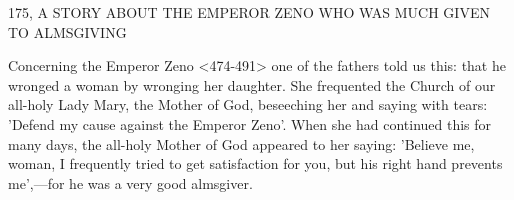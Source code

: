 175, A STORY ABOUT THE EMPEROR ZENO
WHO WAS MUCH GIVEN TO ALMSGIVING

Concerning the Emperor Zeno <474-491> one of the fathers told us
this: that he wronged a woman by wronging her daughter.
She
frequented the Church of our all-holy Lady Mary, the Mother of
God, beseeching her and saying with tears: 'Defend my cause
against the Emperor Zeno'.
When she had continued this for many
days, the all-holy Mother of God appeared to her saying: 'Believe
me, woman, I frequently tried to get satisfaction for you, but his
right hand prevents me',—for he was a very good almsgiver.

